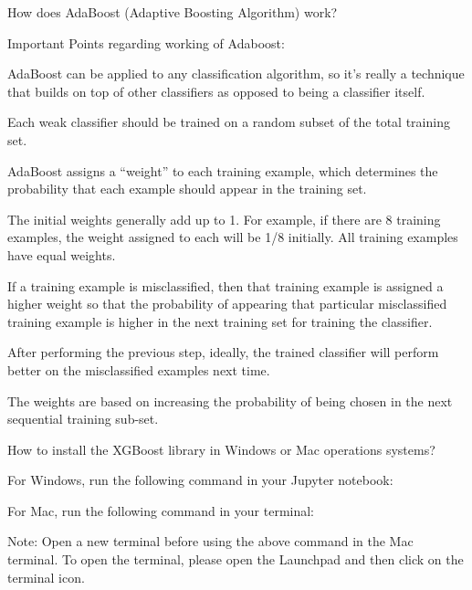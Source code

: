 	\begin{qanda}
		\begin{question}
How does AdaBoost (Adaptive Boosting Algorithm) work?
		\end{question}

		\begin{answer}Important Points regarding working of Adaboost:
			\begin{bulletedlist}
				\item AdaBoost can be applied to any classification algorithm, so it's really a technique that builds on top of other classifiers as opposed to being a classifier itself.
				\item Each weak classifier should be trained on a random subset of the total training set.
				\item AdaBoost assigns a ``weight'' to each training example, which determines the probability that each example should appear in the training set.
				\begin{bulletedlist}
					\item The initial weights generally add up to 1.  For example, if there are 8 training examples, the weight assigned to each will be 1/8 initially.  All training examples have equal weights.
				\end{bulletedlist}
				\item If a training example is misclassified, then that training example is assigned a higher weight so that the probability of appearing that particular misclassified training example is higher in the next training set for training the classifier.
				\item After performing the previous step, ideally, the trained classifier will perform better on the misclassified examples next time.
				\item The weights are based on increasing the probability of being chosen in the next sequential training sub-set.\end{bulletedlist}\end{answer}\end{qanda}%

    \begin{qanda}
		\begin{question}
How to install the XGBoost library in Windows or Mac operations systems?
		\end{question}

		\begin{answer}
For Windows, run the following command in your Jupyter notebook:

\noindent {}

For Mac, run the following command in your terminal:

\noindent {}

Note: Open a new terminal before using the above command in the Mac terminal. To open the terminal, please open the Launchpad and then click on the terminal icon.
		\end{answer}
  \end{qanda}

